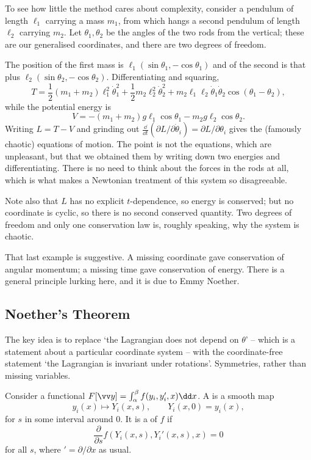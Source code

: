 \documentclass[a4paper]{scrartcl}
\begin{document}
\begin{example}
	To see how little the method cares about complexity, consider a pendulum of length $\ell_1$ carrying a mass $m_1$, from which hangs a second pendulum of length $\ell_2$ carrying $m_2$. Let $\theta_1, \theta_2$ be the angles of the two rods from the vertical; these are our generalised coordinates, and there are two degrees of freedom.

	The position of the first mass is $\ell_1(\sin\theta_1, -\cos\theta_1)$ and of the second is that plus $\ell_2(\sin\theta_2, -\cos\theta_2)$. Differentiating and squaring,
	$$
	T = \frac{1}{2}(m_1 + m_2)\ell_1^2\dot\theta_1^2 + \frac{1}{2}m_2\ell_2^2\dot\theta_2^2 + m_2\ell_1\ell_2 \dot\theta_1\dot\theta_2\cos(\theta_1 - \theta_2),
	$$
	while the potential energy is
	$$
	V = -(m_1 + m_2)g\ell_1\cos\theta_1 - m_2 g \ell_2\cos\theta_2.
	$$
	Writing $L = T - V$ and grinding out $\frac{\dd}{\dd t}(\partial L/\partial \dot\theta_i) = \partial L/\partial\theta_i$ gives the (famously chaotic) equations of motion. The point is not the equations, which are unpleasant, but that we obtained them by writing down two energies and differentiating. There is no need to think about the forces in the rods at all, which is what makes a Newtonian treatment of this system so disagreeable.

	Note also that $L$ has no explicit $t$-dependence, so energy is conserved; but no coordinate is cyclic, so there is no second conserved quantity. Two degrees of freedom and only one conservation law is, roughly speaking, why the system is chaotic.
\end{example}

That last example is suggestive. A missing coordinate gave conservation of angular momentum; a missing time gave conservation of energy. There is a general principle lurking here, and it is due to Emmy Noether.

\subsection{Noether's Theorem}\label{sec:noether}

The key idea is to replace `the Lagrangian does not depend on $\theta$' -- which is a statement about a particular coordinate system -- with the coordinate-free statement `the Lagrangian is invariant under rotations'. Symmetries, rather than missing variables.

\begin{definition}
	Consider a functional $F[\vv y] = \int_\alpha^\beta f(y_i, y_i', x)\dd x$. A  is a smooth map
	$$
	y_i(x) \longmapsto Y_i(x, s), \qquad Y_i(x, 0) = y_i(x),
	$$
	for $s$ in some interval around $0$. It is a  of $f$ if
	$$
	\frac{\partial}{\partial s}f\left(Y_i(x, s), Y_i'(x, s), x\right) = 0
	$$
	for all $s$, where $' = \partial/\partial x$ as usual.
\end{definition}
\end{document}
